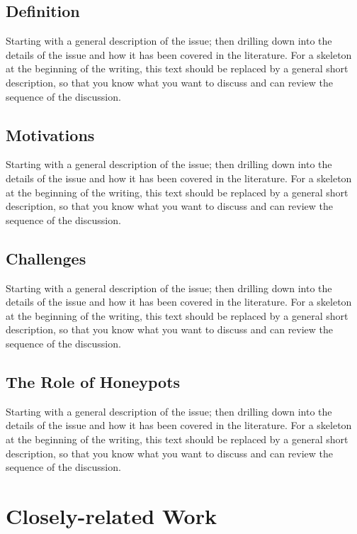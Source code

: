 \subsection{Definition}

Starting with a general description of the issue; then drilling down into the details of the issue and how it has been covered in the literature. For a skeleton at the beginning of the writing, this text should be replaced by a general short description, so that you know what you want to discuss and can review the sequence of the discussion.

\subsection{Motivations}

Starting with a general description of the issue; then drilling down into the details of the issue and how it has been covered in the literature. For a skeleton at the beginning of the writing, this text should be replaced by a general short description, so that you know what you want to discuss and can review the sequence of the discussion.

\subsection{Challenges}

Starting with a general description of the issue; then drilling down into the details of the issue and how it has been covered in the literature. For a skeleton at the beginning of the writing, this text should be replaced by a general short description, so that you know what you want to discuss and can review the sequence of the discussion.

\subsection{The Role of Honeypots}

Starting with a general description of the issue; then drilling down into the details of the issue and how it has been covered in the literature. For a skeleton at the beginning of the writing, this text should be replaced by a general short description, so that you know what you want to discuss and can review the sequence of the discussion.


\section{Closely-related Work}

